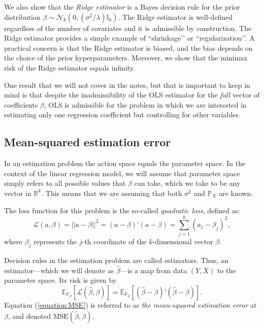\documentclass[11pt]{article} %
\begin{document}


We also show that the \emph{Ridge estimator} is a Bayes decision rule for the prior distribution $\beta \sim \mathcal{N}_{k}(0 , (\sigma^2/ \lambda) \mathbb{I}_k )$. The Ridge estimator is well-defined regardless of the number of covariates and it is admissible by construction. The Ridge estimator provides a simple example of ``shrinkage’’ or ``regularization’’. A practical concern is that the Ridge estimator is biased, and the bias depends on the choice of the prior hyperparameters. Moreover, we show that the minimax risk of the Ridge estimator equals infinity.

One result that we will not cover in the notes, but that is important to keep in mind is that despite the inadmissibility of the OLS estimator for the \emph{full} vector of coefficients $\beta$, OLS is admissible for the problem in which we are interested in estimating only one regression coefficient but controlling for other variables.   



\subsection{Mean-squared estimation error} 
In an estimation problem the action space equals the parameter space. In the context of the linear regression model, we will assume that parameter space simply refers to all possible values that $\beta$ can take, which we take to be any vector in $\mathbb{R}^{k}$. This means that we are assuming that both $\sigma^2$ and $\mathbb{P}_{X}$ are known. 


The loss function for this problem is the so-called \emph{quadratic loss}, defined as:
\[ \mathcal{L}(a, \beta) = || a- \beta ||^2 = (a-\beta)’(a-\beta) =  \sum_{j=1}^{k} (a_j  - \beta_j)^2,  \]
where $\beta_j$ represents the $j$-th coordinate of the $k$-dimensional vector $\beta$. 

Decision rules in the estimation problem are called estimators. Thus, an estimator---which we will denote as $\widehat{\beta}$---is a map from data $(Y,X)$ to the parameter space. Its risk is given by
\begin{equation} \label{equation:MSE}
\mathbb{E}_{\mathbb{P}_{\beta}}[ \mathcal{L}(\widehat{\beta}, \beta) ] = \mathbb{E}_{\mathbb{P}_{\beta}}[ (\widehat{\beta}- \beta)’(\widehat{\beta}-\beta) ]. 
\end{equation}
Equation (\ref{equation:MSE}) is referred to as \emph{the mean-squared estimation error} at $\beta$, and denoted $\textrm{MSE}(\widehat{\beta}, \beta)$. 
\end{document}
